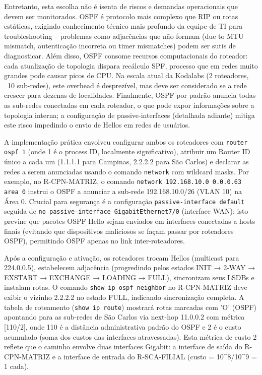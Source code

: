 \documentclass[12pt,a4paper]{article}
\begin{document}
Entretanto, esta escolha não é isenta de riscos e demandas operacionais que devem ser monitorados. OSPF é protocolo mais complexo que RIP ou rotas estáticas, exigindo conhecimento técnico mais profundo da equipe de TI para troubleshooting -- problemas como adjacências que não formam (due to MTU mismatch, autenticação incorreta ou timer mismatches) podem ser sutis de diagnosticar. Além disso, OSPF consome recursos computacionais do roteador: cada atualização de topologia dispara recálculo SPF, processo que em redes muito grandes pode causar picos de CPU. Na escala atual da Kodalabs (2 roteadores, ~10 sub-redes), este overhead é desprezível, mas deve ser considerado se a rede crescer para dezenas de localidades. Finalmente, OSPF por padrão anuncia todas as sub-redes conectadas em cada roteador, o que pode expor informações sobre a topologia interna; a configuração de passive-interfaces (detalhada adiante) mitiga este risco impedindo o envio de Hellos em redes de usuários.

A implementação prática envolveu configurar ambos os roteadores com \texttt{router ospf 1} (onde 1 é o process ID, localmente significativo), atribuir um Router ID único a cada um (1.1.1.1 para Campinas, 2.2.2.2 para São Carlos) e declarar as redes a serem anunciadas usando o comando \texttt{network} com wildcard masks. Por exemplo, no R-CPN-MATRIZ, o comando \texttt{network 192.168.10.0 0.0.0.63 area 0} instrui o OSPF a anunciar a sub-rede 192.168.10.0/26 (VLAN 10) na Área 0. Crucial para segurança é a configuração \texttt{passive-interface default} seguida de \texttt{no passive-interface GigabitEthernet7/0} (interface WAN): isto previne que pacotes OSPF Hello sejam enviados em interfaces conectadas a hosts finais (evitando que dispositivos maliciosos se façam passar por roteadores OSPF), permitindo OSPF apenas no link inter-roteadores.

Após a configuração e ativação, os roteadores trocam Hellos (multicast para 224.0.0.5), estabelecem adjacência (progredindo pelos estados INIT → 2-WAY → EXSTART → EXCHANGE → LOADING → FULL), sincronizam seus LSDBs e instalam rotas. O comando \texttt{show ip ospf neighbor} no R-CPN-MATRIZ deve exibir o vizinho 2.2.2.2 no estado FULL, indicando sincronização completa. A tabela de roteamento (\texttt{show ip route}) mostrará rotas marcadas com 'O' (OSPF) apontando para as sub-redes de São Carlos via next-hop 11.0.0.2 com métrica [110/2], onde 110 é a distância administrativa padrão do OSPF e 2 é o custo acumulado (soma dos custos das interfaces atravessadas). Esta métrica de custo 2 reflete que o caminho envolve duas interfaces Gigabit: a interface de saída do R-CPN-MATRIZ e a interface de entrada do R-SCA-FILIAL (custo = 10^8/10^9 = 1 cada).
\end{document}
